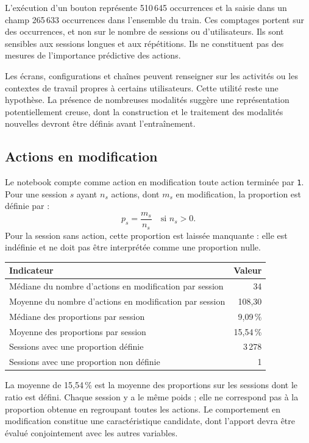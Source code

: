 \documentclass[10pt,a4paper]{article}
\begin{document}
L'exécution d'un bouton représente 510\,645 occurrences et la saisie dans
un champ 265\,633 occurrences dans l'ensemble du train. Ces comptages
portent sur des occurrences, et non sur le nombre de sessions ou
d'utilisateurs. Ils sont sensibles aux sessions longues et aux répétitions.
Ils ne constituent pas des mesures de l'importance prédictive des actions.

Les écrans, configurations et chaînes peuvent renseigner sur les activités
ou les contextes de travail propres à certains utilisateurs. Cette utilité
reste une hypothèse. La présence de nombreuses modalités suggère une
représentation potentiellement creuse, dont la construction et le traitement
des modalités nouvelles devront être définis avant l'entraînement.

\subsection{Actions en modification}
Le notebook compte comme action en modification toute action terminée
par \texttt{1}. Pour une session $s$ ayant $n_s$ actions, dont $m_s$ en
modification, la proportion est définie par :
\[
 p_s=\frac{m_s}{n_s}\quad\text{si } n_s>0.
\]
Pour la session sans action, cette proportion est laissée manquante :
elle est indéfinie et ne doit pas être interprétée comme une proportion nulle.

\begin{center}
\begin{tabularx}{\linewidth}{Y r}
\toprule
Indicateur & Valeur \\
\midrule
Médiane du nombre d'actions en modification par session & 34 \\
Moyenne du nombre d'actions en modification par session & 108,30 \\
Médiane des proportions par session & 9,09\,\% \\
Moyenne des proportions par session & 15,54\,\% \\
Sessions avec une proportion définie & 3\,278 \\
Sessions avec une proportion non définie & 1 \\
\bottomrule
\end{tabularx}
\end{center}

La moyenne de 15,54\,\% est la moyenne des proportions sur les sessions
dont le ratio est défini. Chaque session y a le même poids ; elle ne
correspond pas à la proportion obtenue en regroupant toutes les actions.
Le comportement en modification constitue une caractéristique candidate,
dont l'apport devra être évalué conjointement avec les autres variables.
\end{document}
